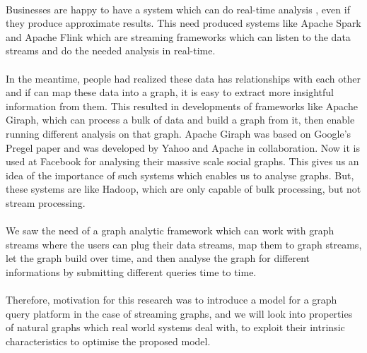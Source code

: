 \documentclass[12pt]{report}
\numberwithin{figure}{section}
\numberwithin{table}{section}
\begin{document}
\paragraph{}

Businesses are happy to have a system which can do real-time analysis \cite{Vitria}, even if they produce approximate results. This need produced systems like Apache Spark and Apache Flink which are streaming frameworks which can listen to the data streams and do the needed  analysis in real-time. 

\paragraph{}

In the meantime, people had realized these data has relationships with each other and if can map these data into a graph, it is easy to extract more insightful information from them. This resulted in developments of frameworks like Apache Giraph, which can process a bulk of data and build a graph from it, then enable running different analysis on that graph. Apache Giraph was based on Google's Pregel\cite{Pregel} paper and was developed by Yahoo and Apache in collaboration. Now it is used at Facebook\cite{Facebook} for analysing their massive scale social graphs. This gives us an idea of the importance of such systems which enables us to analyse graphs.  But, these systems are like Hadoop, which are only capable of bulk processing, but not stream processing.

\paragraph{}

We saw the need of a graph analytic framework which can work with graph streams where the users can plug their data streams, map them to graph streams, let the graph build over time, and then analyse the graph for different informations by submitting different queries time to time.

\paragraph{}

Therefore, motivation for this research was to introduce a model for a graph query platform in the case of streaming graphs, and we will look into properties of natural graphs which real world systems deal with, to exploit their intrinsic characteristics to optimise the proposed model.
\end{document}
